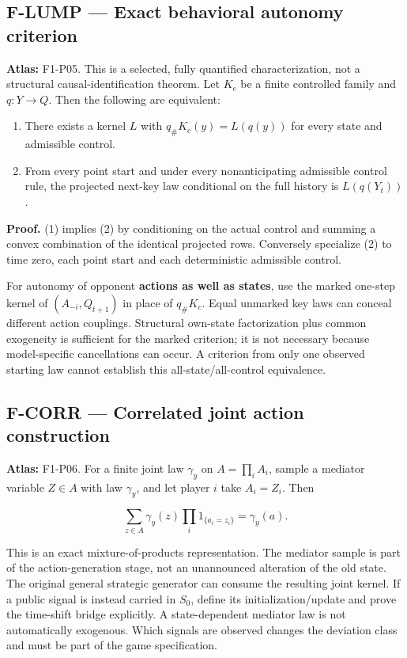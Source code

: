 \documentclass[
  11pt,
  a4paper,
]{article}
\providecommand{\tightlist}{%
  \setlength{\itemsep}{0pt}\setlength{\parskip}{0pt}}
\begin{document}
\subsection{F-LUMP --- Exact behavioral autonomy
criterion}\label{f-lump-exact-behavioral-autonomy-criterion}

\textbf{Atlas:} F1-P05. This is a selected, fully quantified
characterization, not a structural causal-identification theorem. Let
\(K_c\) be a finite controlled family and \(q:Y\to Q\). Then the
following are equivalent:

\begin{enumerate}
\def\labelenumi{\arabic{enumi}.}
\tightlist
\item
  There exists a kernel \(L\) with \(q_\#K_c(y)=L(q(y))\) for every
  state and admissible control.
\item
  From every point start and under every nonanticipating admissible
  control rule, the projected next-key law conditional on the full
  history is \(L(q(Y_t))\).
\end{enumerate}

\textbf{Proof.} (1) implies (2) by conditioning on the actual control
and summing a convex combination of the identical projected rows.
Conversely specialize (2) to time zero, each point start and each
deterministic admissible control.

For autonomy of opponent \textbf{actions as well as states}, use the
marked one-step kernel of \((A_{-i},Q_{t+1})\) in place of \(q_\#K_c\).
Equal unmarked key laws can conceal different action couplings.
Structural own-state factorization plus common exogeneity is sufficient
for the marked criterion; it is not necessary because model-specific
cancellations can occur. A criterion from only one observed starting law
cannot establish this all-state/all-control equivalence.

\subsection{F-CORR --- Correlated joint action
construction}\label{f-corr-correlated-joint-action-construction}

\textbf{Atlas:} F1-P06. For a finite joint law \(\gamma_y\) on
\(A=\prod_i A_i\), sample a mediator variable \(Z\in A\) with law
\(\gamma_y\), and let player \(i\) take \(A_i=Z_i\). Then

\[\sum_{z\in A}\gamma_y(z)\prod_i1_{\{a_i=z_i\}}=\gamma_y(a).\]

This is an exact mixture-of-products representation. The mediator sample
is part of the action-generation stage, not an unannounced alteration of
the old state. The original general strategic generator can consume the
resulting joint kernel. If a public signal is instead carried in
\(S_0\), define its initialization/update and prove the time-shift
bridge explicitly. A state-dependent mediator law is not automatically
exogenous. Which signals are observed changes the deviation class and
must be part of the game specification.
\end{document}
